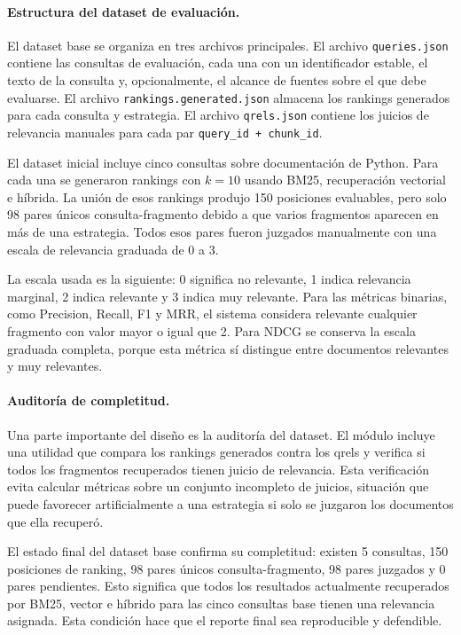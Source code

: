 \documentclass[11pt]{article}
\begin{document}
\paragraph{Estructura del dataset de evaluación.}
El dataset base se organiza en tres archivos principales. El archivo \texttt{queries.json} contiene las consultas de evaluación, cada una con un identificador estable, el texto de la consulta y, opcionalmente, el alcance de fuentes sobre el que debe evaluarse. El archivo \texttt{rankings.generated.json} almacena los rankings generados para cada consulta y estrategia. El archivo \texttt{qrels.json} contiene los juicios de relevancia manuales para cada par \texttt{query\_id + chunk\_id}.

El dataset inicial incluye cinco consultas sobre documentación de Python. Para cada una se generaron rankings con \(k=10\) usando BM25, recuperación vectorial e híbrida. La unión de esos rankings produjo 150 posiciones evaluables, pero solo 98 pares únicos consulta-fragmento debido a que varios fragmentos aparecen en más de una estrategia. Todos esos pares fueron juzgados manualmente con una escala de relevancia graduada de 0 a 3.

La escala usada es la siguiente: 0 significa no relevante, 1 indica relevancia marginal, 2 indica relevante y 3 indica muy relevante. Para las métricas binarias, como Precision, Recall, F1 y MRR, el sistema considera relevante cualquier fragmento con valor mayor o igual que 2. Para NDCG se conserva la escala graduada completa, porque esta métrica sí distingue entre documentos relevantes y muy relevantes.

\paragraph{Auditoría de completitud.}
Una parte importante del diseño es la auditoría del dataset. El módulo incluye una utilidad que compara los rankings generados contra los qrels y verifica si todos los fragmentos recuperados tienen juicio de relevancia. Esta verificación evita calcular métricas sobre un conjunto incompleto de juicios, situación que puede favorecer artificialmente a una estrategia si solo se juzgaron los documentos que ella recuperó.

El estado final del dataset base confirma su completitud: existen 5 consultas, 150 posiciones de ranking, 98 pares únicos consulta-fragmento, 98 pares juzgados y 0 pares pendientes. Esto significa que todos los resultados actualmente recuperados por BM25, vector e híbrido para las cinco consultas base tienen una relevancia asignada. Esta condición hace que el reporte final sea reproducible y defendible.
\end{document}
